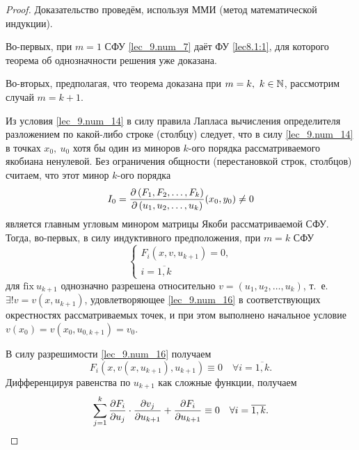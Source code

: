 \documentclass[../../main.tex]{subfiles}
\begin{document}
\begin{proof}
    Доказательство проведём, используя ММИ
    (метод математической индукции).
    
    Во-первых, при $m = 1$ СФУ \eqref{lec_9.num_7} 
    даёт ФУ \eqref{lec8.1:1}, для которого теорема об
    однозначности решения уже доказана.
    
    Во-вторых, предполагая, что теорема доказана
    при $m = k,\ k \in \mathbb{N}$, рассмотрим случай
    $m = k + 1$.
    
    Из условия \eqref{lec_9.num_14} в силу правила Лапласа
    вычисления определителя разложением по какой-либо
    строке (столбцу) следует, что в силу \eqref{lec_9.num_14} 
    в точках $x_0,\ u_0$ хотя бы один из миноров 
    $k$-ого порядка рассматриваемого якобиана ненулевой.
    Без ограничения общности (перестановкой строк, столбцов)
    считаем, что этот минор $k$-ого порядка
    \begin{equation}
        \label{lec_9.num_15}
        I_0 = \frac{\partial \left(F_1, F_2, \dots, F_k\right)}{\partial \left(u_1, u_2, \dots, u_k\right)}(x_0, y_0) \neq 0
    \end{equation}
    является главным угловым минором матрицы Якоби рассматриваемой
    СФУ. Тогда, во-первых, в силу индуктивного
    предположения, при $m = k$ СФУ
    \begin{equation}
        \label{lec_9.num_16}
        \begin{cases}
            F_i\left(x, v, u_{k+1}\right) = 0, \\
            i = \overline{1, k}
        \end{cases}
    \end{equation}
    для $\text{fix}\ u_{k+1}$ однозначно разрешена относительно 
    $v = \left(u_1, u_2, \dots, u_k\right)$, т.~е. 
    $\exists!v = v\left(x, u_{k+1}\right)$, удовлетворяющее
    \eqref{lec_9.num_16} в соответствующих окрестностях
    рассматриваемых точек, и при этом выполнено начальное 
    условие
    $v(x_0) = v(x_0, u_{0,k+1}) = v_0$.
    
    В силу разрешимости \eqref{lec_9.num_16} получаем
    \begin{equation}
	\label{lec9,a}
    F_i(x, v(x, u_{k+1}), u_{k+1}) \equiv 0\quad\forall i = \overline{1,k}.
    \end{equation}
    Дифференцируя равенства по $u_{k+1}$ как сложные функции, получаем
    \begin{equation}
	\label{lec9,b}
    \sum_{j=1}^k \frac{\partial F_i}{\partial u_j}\cdot\frac{\partial v_j}{\partial u_{k+1}} +
    \frac{\partial F_i}{\partial u_{k+1}} \equiv 0\quad\forall i = \overline{1,k}.
    \end{equation}
    

\end{proof}
\end{document}
